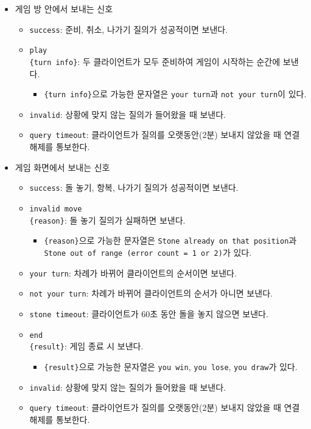 \documentclass[a4paper, 10pt]{article}
\begin{document}
\begin{itemize}
\begin{itemize}
  \end{itemize}
  \item 게임 방 안에서 보내는 신호
  \begin{itemize}
    \item \texttt{success}: 준비, 취소, 나가기 질의가 성공적이면 보낸다.
    \item \texttt{play\\\{turn info\}}: 두 클라이언트가 모두 준비하여 게임이 시작하는 순간에 보낸다.
    \begin{itemize}
      \item \texttt{\{turn info\}}으로 가능한 문자열은 \texttt{your turn}과 \texttt{not your turn}이 있다.
    \end{itemize}
    \item \texttt{invalid}: 상황에 맞지 않는 질의가 들어왔을 때 보낸다.
    \item \texttt{query timeout}: 클라이언트가 질의를 오랫동안(2분) 보내지 않았을 때 연결 해제를 통보한다.
  \end{itemize}
  \item 게임 화면에서 보내는 신호
  \begin{itemize}
    \item \texttt{success}: 돌 놓기, 항복, 나가기 질의가 성공적이면 보낸다.
    \item \texttt{invalid move\\\{reason\}}: 돌 놓기 질의가 실패하면 보낸다.
    \begin{itemize}
      \item \texttt{\{reason\}}으로 가능한 문자열은 \texttt{Stone already on that position}과\\
      \texttt{Stone out of range (error count = 1 or 2)}가 있다.
    \end{itemize}
    \item \texttt{your turn}: 차례가 바뀌어 클라이언트의 순서이면 보낸다.
    \item \texttt{not your turn}: 차례가 바뀌어 클라이언트의 순서가 아니면 보낸다.
    \item \texttt{stone timeout}: 클라이언트가 60초 동안 돌을 놓지 않으면 보낸다.
    \item \texttt{end\\\{result\}}: 게임 종료 시 보낸다.
    \begin{itemize}
      \item \texttt{\{result\}}으로 가능한 문자열은 \texttt{you win}, \texttt{you lose}, \texttt{you draw}가 있다.
    \end{itemize}
    \item \texttt{invalid}: 상황에 맞지 않는 질의가 들어왔을 때 보낸다.
    \item \texttt{query timeout}: 클라이언트가 질의를 오랫동안(2분) 보내지 않았을 때 연결 해제를 통보한다.
  \end{itemize}
\end{itemize}
\end{document}
